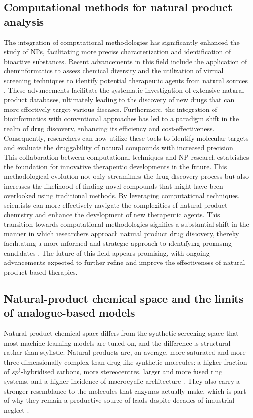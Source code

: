 \subsection{Computational methods for natural product analysis}
The integration of computational methodologies has significantly enhanced the study of NPs, facilitating more precise characterization and identification of bioactive substances. Recent advancements in this field include the application of cheminformatics to assess chemical diversity and the utilization of virtual screening techniques to identify potential therapeutic agents from natural sources \cite{MedinaFranco2013}. These advancements facilitate the systematic investigation of extensive natural product databases, ultimately leading to the discovery of new drugs that can more effectively target various diseases. Furthermore, the integration of bioinformatics with conventional approaches has led to a paradigm shift in the realm of drug discovery, enhancing its efficiency and cost-effectiveness. Consequently, researchers can now utilize these tools to identify molecular targets and evaluate the druggability of natural compounds with increased precision. This collaboration between computational techniques and NP research establishes the foundation for innovative therapeutic developments in the future. This methodological evolution not only streamlines the drug discovery process but also increases the likelihood of finding novel compounds that might have been overlooked using traditional methods. By leveraging computational techniques, scientists can more effectively navigate the complexities of natural product chemistry and enhance the development of new therapeutic agents. This transition towards computational methodologies signifies a substantial shift in the manner in which researchers approach natural product drug discovery, thereby facilitating a more informed and strategic approach to identifying promising candidates \cite{Fajinmi2023,MedinaFranco2013}. The future of this field appears promising, with ongoing advancements expected to further refine and improve the effectiveness of natural product-based therapies.

\subsection{Natural-product chemical space and the limits of analogue-based models}

Natural-product chemical space differs from the synthetic screening space that most machine-learning models are tuned on, and the difference is structural rather than stylistic. Natural products are, on average, more saturated and more three-dimensionally complex than drug-like synthetic molecules: a higher fraction of $sp^3$-hybridised carbons, more stereocentres, larger and more fused ring systems, and a higher incidence of macrocyclic architecture \cite{Atanasov2021,Gorgulla2020}. They also carry a stronger resemblance to the molecules that enzymes actually make, which is part of why they remain a productive source of leads despite decades of industrial neglect \cite{MedinaFranco2013,Simoben2020}.

